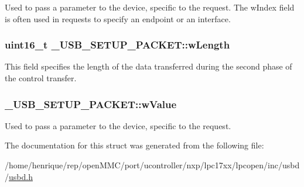 Used to pass a parameter to the device, specific to the request. The w\-Index field is often used in requests to specify an endpoint or an interface. \hypertarget{struct__USB__SETUP__PACKET_a2beb83e5854b4a7bc518e5cfbc3f38a6}{
\subsubsection[{w\-Length}]{\setlength{\rightskip}{0pt plus 5cm}uint16\-\_\-t \-\_\-\-U\-S\-B\-\_\-\-S\-E\-T\-U\-P\-\_\-\-P\-A\-C\-K\-E\-T\-::w\-Length}}\label{struct__USB__SETUP__PACKET_a2beb83e5854b4a7bc518e5cfbc3f38a6}
This field specifies the length of the data transferred during the second phase of the control transfer. \hypertarget{struct__USB__SETUP__PACKET_a790f014cc1dac6148a182b1cbe24bffe}{
\subsubsection[{w\-Value}]{ \-\_\-\-U\-S\-B\-\_\-\-S\-E\-T\-U\-P\-\_\-\-P\-A\-C\-K\-E\-T\-::w\-Value}}\label{struct__USB__SETUP__PACKET_a790f014cc1dac6148a182b1cbe24bffe}
Used to pass a parameter to the device, specific to the request. 

The documentation for this struct was generated from the following file\-:\begin{DoxyCompactItemize}
\item 
/home/henrique/rep/open\-M\-M\-C/port/ucontroller/nxp/lpc17xx/lpcopen/inc/usbd/\hyperlink{usbd_8h}{usbd.\-h}\end{DoxyCompactItemize}
